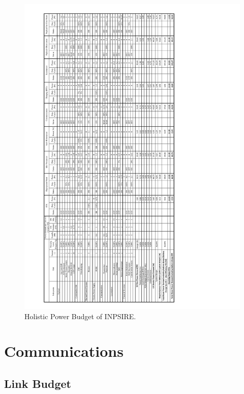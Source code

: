 \begin{figure}[htb]
{\centering
\includegraphics[width=1.0\textwidth]{Media/budgeteps}
\caption{Holistic Power Budget of INPSIRE.}
\label{tab:powerbudgetcomplete}
}
\end{figure}

\clearpage

\setcounter{figure}{0}
\setcounter{table}{0}

\section{Communications} 
\label{sec:AppendixCOM}

\subsection{Link Budget}
\label{app:LinkBudget}


